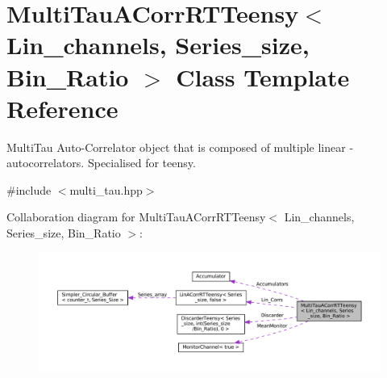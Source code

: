 \hypertarget{classMultiTauACorrRTTeensy}{}\section{Multi\+Tau\+A\+Corr\+R\+T\+Teensy$<$ Lin\+\_\+channels, Series\+\_\+size, Bin\+\_\+\+Ratio $>$ Class Template Reference}
\label{classMultiTauACorrRTTeensy}


Multi\+Tau Auto-\/\+Correlator object that is composed of multiple linear -\/ autocorrelators. Specialised for teensy.  




{\ttfamily \#include $<$multi\+\_\+tau.\+hpp$>$}



Collaboration diagram for Multi\+Tau\+A\+Corr\+R\+T\+Teensy$<$ Lin\+\_\+channels, Series\+\_\+size, Bin\+\_\+\+Ratio $>$\+:
\nopagebreak
\begin{figure}[H]
\begin{center}
\leavevmode
\includegraphics[width=350pt]{classMultiTauACorrRTTeensy__coll__graph}
\end{center}
\end{figure}
